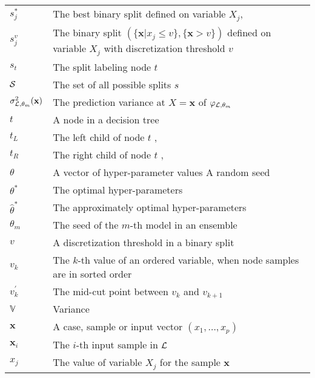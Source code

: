 \begin{tabularx}{\textwidth}{ l X }
$s^*_j$ & The best binary split defined on variable $X_j$\dotfill  \pageref{ntn:s-star}, \pageref{eqn:best-split-single}\\
$s_j^v$ & The binary split $(\{\mathbf{x}|x_j \leq v\}, \{\mathbf{x} > v\})$ defined on variable $X_j$ with discretization threshold $v$ \dotfill  \pageref{ntn:s_jv}\\
$s_t$ & The split labeling node $t$ \dotfill  \pageref{ntn:s_t}\\
${\cal S}$ & The set of all possible splits $s$ \dotfill  \pageref{ntn:S-all}\\
$\sigma^2_{{\cal L},\theta_m}(\mathbf{x})$ & The prediction variance at $X = \mathbf{x}$ of $\varphi_{{\cal L},\theta_m}$ \dotfill \pageref{eqn:4:sigma} \\
$t$ & A node in a decision tree \dotfill  \pageref{ntn:node}\\
$t_L$ & The left child of node $t$ \dotfill \pageref{ntn:t_L}, \pageref{ntn:t_L2}\\
$t_R$ & The right child of node $t$ \dotfill \pageref{ntn:t_R}, \pageref{ntn:t_R2}\\
$\theta$ & A vector of hyper-parameter values \dotfill  \pageref{ntn:theta}\newline A random seed \dotfill \pageref{ntn:theta-seed}\\
$\theta^*$ & The optimal hyper-parameters \dotfill  \pageref{ntn:theta-star}\\
$\widehat{\theta}^*$ & The approximately optimal hyper-parameters \dotfill  \pageref{ntn:theta-star-approx}\\
$\theta_m$ & The seed of the $m$-th model in an ensemble \dotfill  \pageref{ntn:theta-seed-m}\\
$v$ & A discretization threshold in a binary split \dotfill  \pageref{ntn:v}\\
$v_k$ & The $k$-th value of an ordered variable, when node samples are in sorted order \dotfill  \pageref{ntn:v_k}\\
$v_k^\prime$ & The mid-cut point between $v_k$ and $v_{k+1}$ \dotfill  \pageref{ntn:v_k_prime}\\
$\mathbb{V}$ & Variance \dotfill \\
$\textbf{x}$ & A case, sample or input vector $(x_1, \dots, x_p)$ \dotfill  \pageref{ntn:sample-x}\\
$\textbf{x}_i$ & The $i$-th input sample in ${\cal L}$ \dotfill  \pageref{ntn:sample-x_i}\\
$x_j$ & The value of variable $X_j$ for the sample $\textbf{x}$ \dotfill  \pageref{ntn:value-x_j}\\

\end{tabularx}
